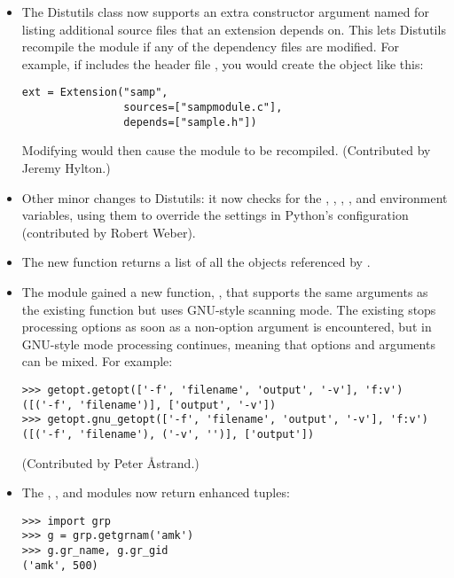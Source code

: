 \documentclass{howto}
\begin{document}
\begin{itemize}
\item The Distutils  class now supports
an extra constructor argument named  for listing
additional source files that an extension depends on.  This lets
Distutils recompile the module if any of the dependency files are
modified.  For example, if  includes the header
file , you would create the  object like
this:

\begin{verbatim}
ext = Extension("samp",
                sources=["sampmodule.c"],
                depends=["sample.h"])
\end{verbatim}

Modifying  would then cause the module to be recompiled.
(Contributed by Jeremy Hylton.)

\item Other minor changes to Distutils:
it now checks for the , , ,
, and  environment variables, using
them to override the settings in Python's configuration (contributed
by Robert Weber).

\item The new  function returns a
list of all the objects referenced by .

\item The  module gained a new function,
, that supports the same arguments as the existing
 function but uses GNU-style scanning mode.
The existing  stops processing options as soon as a
non-option argument is encountered, but in GNU-style mode processing
continues, meaning that options and arguments can be mixed.  For
example:

\begin{verbatim}
>>> getopt.getopt(['-f', 'filename', 'output', '-v'], 'f:v')
([('-f', 'filename')], ['output', '-v'])
>>> getopt.gnu_getopt(['-f', 'filename', 'output', '-v'], 'f:v')
([('-f', 'filename'), ('-v', '')], ['output'])
\end{verbatim}

(Contributed by Peter \AA{strand}.)

\item The , , and  modules
now return enhanced tuples:

\begin{verbatim}
>>> import grp
>>> g = grp.getgrnam('amk')
>>> g.gr_name, g.gr_gid
('amk', 500)
\end{verbatim}


\end{itemize}
\end{document}
